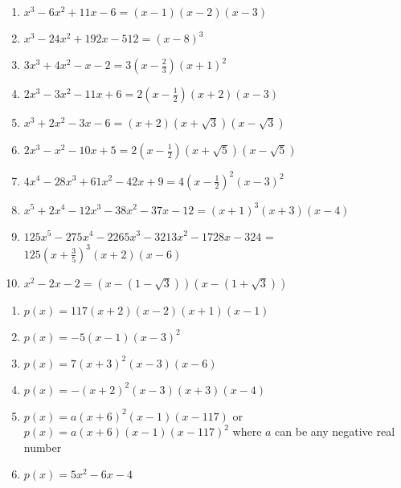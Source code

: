 \begin{enumerate}
\setcounter{enumi}{\value{HW}}

\item $x^{3} - 6x^{2} + 11x - 6 = (x - 1)(x - 2)(x - 3)$
\item $x^{3} - 24x^{2} + 192x - 512 = (x - 8)^{3}$
\item $3x^{3} + 4x^{2} - x - 2 = 3\left(x - \frac{2}{3}\right)(x + 1)^{2}$

\item $2x^3-3x^2-11x+6 = 2\left(x-\frac{1}{2}\right)(x+2)(x-3)$

\item $x^3+2x^2-3x-6 = (x+2)(x+\sqrt{3})(x-\sqrt{3})$
\item $2x^3-x^2-10x+5=2\left(x-\frac{1}{2}\right)(x+\sqrt{5})(x-\sqrt{5})$

\item $4x^{4} - 28x^{3} + 61x^{2} - 42x + 9 = 4\left(x - \frac{1}{2} \right)^{2}(x - 3)^{2}$

\item  $x^5+2x^4-12x^3-38x^2-37x-12 = (x+1)^3(x+3)(x-4)$

\item $125x^{5} - 275x^{4} - 2265x^{3} - 3213x^{2} - 1728x - 324$ = $125\left(x + \frac{3}{5} \right)^{3}(x + 2)(x - 6)$


\item $x^{2} - 2x - 2 = (x - (1 - \sqrt{3}))(x - (1 + \sqrt{3}))$

\setcounter{HW}{\value{enumi}}
\end{enumerate}

\begin{enumerate}
\setcounter{enumi}{\value{HW}}

\item $p(x) = 117(x+2)(x-2)(x+1)(x-1)$

\item $p(x)= -5(x-1)(x-3)^2$

\item  $p(x) = 7(x+3)^2(x-3)(x-6)$

\item $p(x) = -(x + 2)^{2}(x - 3)(x + 3)(x - 4)$

\item $p(x) = a(x+6)^2(x-1)(x-117)$ or $p(x) = a(x+6)(x-1)(x-117)^{2}$ where $a$ can be any negative real number

\item $p(x) = 5x^{2} - 6x - 4$


\end{enumerate}

\closegraphsfile